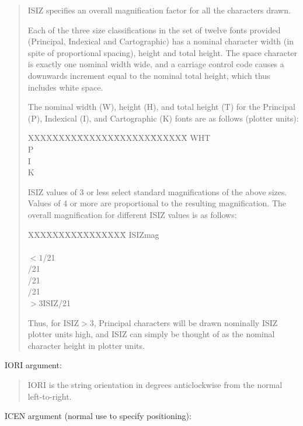 \documentclass[11pt]{article}
\renewcommand{\_}{{\tt\char'137}}     %
\begin{document}
\begin{quote}
ISIZ specifies an overall magnification factor for all the characters drawn.

Each of the three size classifications in the set of twelve
fonts provided (Principal, Indexical and Cartographic) has a
nominal character width (in spite of proportional spacing),
height and total height.  The space character is exactly one
nominal width wide, and a carriage control code causes
a downwards increment equal to the nominal total height, which
thus includes white space.

The nominal width (W), height (H), and total height (T) for
the Principal (P), Indexical (I), and Cartographic (K) fonts
are as follows (plotter units):

\begin{tabbing}
XXXXXXXX\=XXXXXX\=XXXXXX\=XXXXXX\=\kill
\>\>W\>H\>T\\
\>P\\
\>I\\
\>K
\end{tabbing}

ISIZ values of 3 or less select standard magnifications of the
above sizes.  Values of 4 or more are proportional to the
resulting magnification.  The overall magnification for
different ISIZ values is as follows:

\begin{tabbing}
XXXXXXXX\=XXXXXXXX\=\kill
\>ISIZ\>mag\\
\\
\>$<1$/21\\
/21\\
/21\\
/21\\
\>$>3$\>ISIZ/21\\
\end{tabbing}

Thus, for ISIZ$>$3, Principal characters will be drawn nominally
ISIZ plotter units high, and ISIZ can simply be thought of
as the nominal character height in plotter units.
\end{quote}

IORI argument:

\begin{quote}
IORI is the string orientation in degrees anticlockwise from the normal
left-to-right.
\end{quote}

ICEN argument (normal use to specify positioning):
\end{document}
